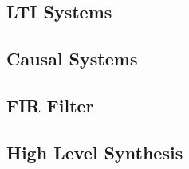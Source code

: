 \subsection{LTI Systems}


\subsection{Causal Systems}


\subsection{FIR Filter}


\subsection{High Level Synthesis}

